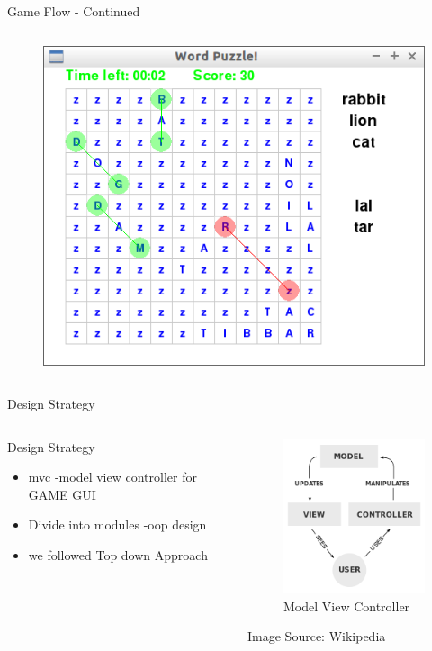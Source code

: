 \documentclass{beamer}
\begin{document}
\begin{frame}{Game Flow - Continued}
\begin{columns}[c]
\begin{column}{3cm}
\begin{figure}
\includegraphics[scale=0.2]{puzzle_running.png}
\end{figure}
\end{column}

\end{columns}
\end{frame}

\begin{frame}{Design Strategy}
\begin{columns}[c]
\begin{column}{5cm}
\begin{block}{Design Strategy}
\begin{itemize}
\item mvc -model view  controller for GAME GUI
\item Divide into modules -oop design
\item we followed Top down Approach
\end{itemize}
\end{block}
\end{column}

\begin{column}{5cm}

\begin{figure}
\includegraphics[scale=0.7]{mvc.png}
\caption{Model View Controller}
\end{figure}
Image Source: Wikipedia
\end{column}
\end{columns}

\end{frame}
\end{document}
